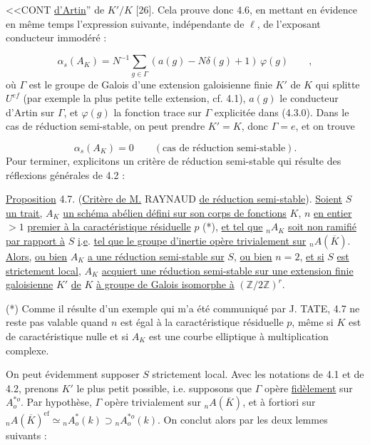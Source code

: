 
<<CONT \underline{d'Artin}'' de $K'/K$ [26]. Cela prouve donc 4.6, en mettant en évidence en même temps l'expression suivante, indépendante de $\ell$, de l'exposant conducteur immodéré :

\begin{equation}\tag{4.6.2}
\alpha_s(A_K) = N^{-1} \sum_{g \in \Gamma} (a(g)-N\delta(g)+1)\, \varphi(g) \qquad ,
\end{equation}
où $\Gamma$ est le groupe de Galois d'une extension galoisienne finie $K'$ de $K$ qui splitte $U^{ef}$ (par exemple la plus petite telle extension, cf. 4.1), $a(g)$ le conducteur d'Artin sur $\Gamma$, et $\varphi(g)$ la fonction trace sur $\Gamma$ explicitée dans (4.3.0). Dans le cas de réduction semi-stable, on peut prendre $K'=K$, donc $\Gamma = e$, et on trouve

\begin{equation}\tag{4.6.3}
\alpha_s(A_K) = 0 \qquad (\mbox{cas de réduction semi-stable}).
\end{equation}
Pour terminer, explicitons un critère de réduction semi-stable qui résulte des réflexions générales de 4.2 :

\underline{Proposition} 4.7. (\underline{Critère de M.} RAYNAUD \underline{de réduction semi-stable}). \underline{Soient} $S$ \underline{un trait,} $A_K$ \underline{un schéma abélien défini sur son corps de fonctions} $K$, $n$ \underline{en entier} $> 1$ \underline{premier à la caractéristique résiduelle} $p$ (*), \underline{et tel que} ${}_nA_K$ \underline{soit non ramifié par rapport à} $S$ \underline{i}.\underline{e}. \underline{tel que le groupe d'inertie opère trivialement sur} ${}_nA(\overline{K})$. \underline{Alors,} \underline{ou bien} $A_K$ \underline{a une réduction semi-stable sur} $S$, \underline{ou bien} $n = 2$, \underline{et si} $S$ \underline{est strictement local}, $A_K$ \underline{acquiert une réduction semi-stable sur une extension finie galoisienne} $K'$ \underline{de} $K$ \underline{à groupe de Galois isomorphe à} $(\mathbb{Z}/2\mathbb{Z})^r$.

(*) Comme il résulte d'un exemple qui m'a été communiqué par J. TATE, 4.7 ne reste pas valable quand $n$ est égal à la caractéristique résiduelle $p$, même si $K$ est de caractéristique nulle et si $A_K$ est une courbe elliptique à multiplication complexe.



On peut évidemment supposer $S$ strictement local. Avec les notations de 4.1 et de 4.2, prenons $K'$ le plus petit possible, i.e. supposons que $\Gamma$ opère \underline{fidèlement} sur $A^{*o}_o$. Par hypothèse, $\Gamma$ opère trivialement sur ${}_nA(\overline{K})$, et à fortiori sur ${}_nA(\overline{K})^{\mathrm{ef}} \simeq {}_nA^*_o(k) \supset {}_nA^{*o}_o(k)$. On conclut alors par les deux lemmes suivants :

